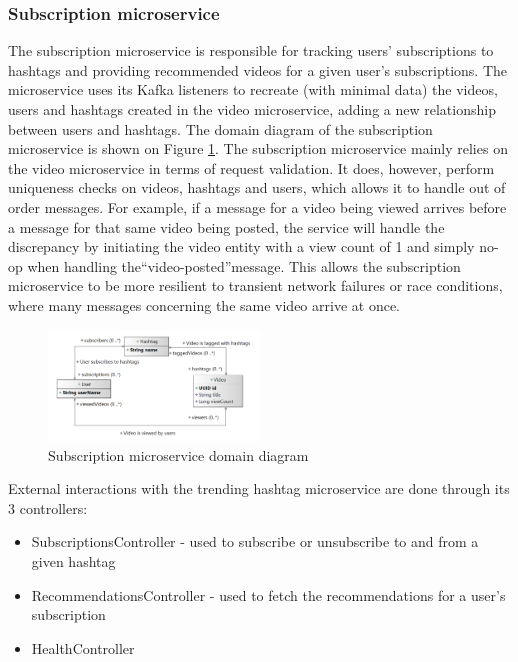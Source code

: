 \documentclass[parskip=full]{article}
\begin{document}
    \subsubsection{Subscription microservice}
    The subscription microservice is responsible for tracking users' subscriptions to hashtags and providing recommended videos for a given user's subscriptions.
    The microservice uses its Kafka listeners to recreate (with minimal data) the videos, users and hashtags created in the video
microservice, adding a new relationship between users and hashtags.
The domain diagram of the subscription microservice is shown on Figure \ref{fig:smDomain}.
The subscription microservice mainly relies on the video microservice in terms of request validation.
It does, however, perform uniqueness checks on videos, hashtags and users, which allows it to handle out of order messages.
For example, if a message for a video being viewed arrives before a message for that same video being posted, the service will handle the discrepancy by initiating the video entity with a view count of 1 and simply no-op when handling the``video-posted''message.
This allows the subscription microservice to be more resilient to transient network failures or race conditions, where many messages concerning the same video arrive at once.

    \begin{figure}
        \includegraphics[width=0.5\textwidth]{sm-domain-diagram}
        \caption{Subscription microservice domain diagram}
        \label{fig:smDomain}
    \end{figure}

    External interactions with the trending hashtag microservice are done through its 3 controllers:

    \begin{itemize}
        \item SubscriptionsController - used to subscribe or unsubscribe to and from a given hashtag
        \item RecommendationsController - used to fetch the recommendations for a user's subscription
        \item HealthController
    \end{itemize}
\end{document}

